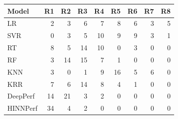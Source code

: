 \begin{tabular}{lrrrrrrrr}
\toprule
Model & R1 & R2 & R3 & R4 & R5 & R6 & R7 & R8 \\
\midrule
LR & 2 & 3 & 6 & 7 & 8 & 6 & 3 & 5 \\
SVR & 0 & 3 & 5 & 10 & 9 & 9 & 3 & 1 \\
RT & 8 & 5 & 14 & 10 & 0 & 3 & 0 & 0 \\
RF & 3 & 14 & 15 & 7 & 1 & 0 & 0 & 0 \\
KNN & 3 & 0 & 1 & 9 & 16 & 5 & 6 & 0 \\
KRR & 7 & 6 & 14 & 8 & 4 & 1 & 0 & 0 \\
DeepPerf & 14 & 21 & 3 & 2 & 0 & 0 & 0 & 0 \\
HINNPerf & 34 & 4 & 2 & 0 & 0 & 0 & 0 & 0 \\
\bottomrule
\end{tabular}
